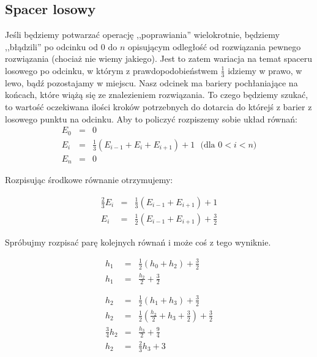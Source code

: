 \documentclass[a4paper,11pt]{article}
\begin{document}
\subsection*{Spacer losowy}

Jeśli będziemy potwarzać operację ,,poprawiania'' wielokrotnie, będziemy
,,błądzili'' po odcinku od $0$ do $n$ opisującym odległość od rozwiązania
pewnego rozwiązania (chociaż nie wiemy jakiego). Jest to
zatem wariacja na temat spaceru losowego po odcinku, w którym z
prawdopodobieństwem $\frac{1}{3}$ idziemy w prawo, w lewo, bądź pozostajamy w
miejscu. Nasz odcinek ma bariery pochłaniające na końcach, które wiążą się ze
znalezieniem rozwiązania. To czego będziemy szukać, to wartość oczekiwana ilości
kroków potrzebnych do dotarcia do którejś z barier z losowego punktu na odcinku.
Aby to policzyć rozpiszemy sobie układ równań: \\

\begin{eqnarray}
  \nonumber E_0 & = & 0 \\
  \nonumber E_i & = & \frac{1}{3}(E_{i-1} + E_{i} + E_{i+1}) + 1
  \ \ \ \mbox{(dla $0 < i < n$)}\\
  \nonumber E_n & = & 0
\end{eqnarray}

Rozpisując środkowe równanie otrzymujemy:

\begin{eqnarray}
  \nonumber \frac{2}{3} E_i & = & \frac{1}{3}(E_{i-1} + E_{i+1}) + 1 \\
  \nonumber E_i & = & \frac{1}{2}(E_{i-1} + E_{i+1}) + \frac{3}{2}
\end{eqnarray}

Spróbujmy rozpisać parę kolejnych równań i może coś z tego wyniknie.

\begin{eqnarray}
  \nonumber h_1 & = & \frac{1}{2}(h_0 + h_2) + \frac{3}{2} \\
  \nonumber h_1 & = & \frac{h_2}{2} + \frac{3}{2} \\
  \nonumber & & \ \\
  \nonumber & & \ \\
  \nonumber h_2 & = & \frac{1}{2}(h_1 + h_3) + \frac{3}{2} \\
  \nonumber h_2 & = & \frac{1}{2}(\frac{h_2}{2} + h_3 + \frac{3}{2}) + \frac{3}{2} \\
  \nonumber \frac{3}{4}h_2 & = & \frac{h_3}{2} + \frac{9}{4} \\
  \nonumber h_2 & = & \frac{2}{3}h_3 + 3
\end{eqnarray}
\end{document}
